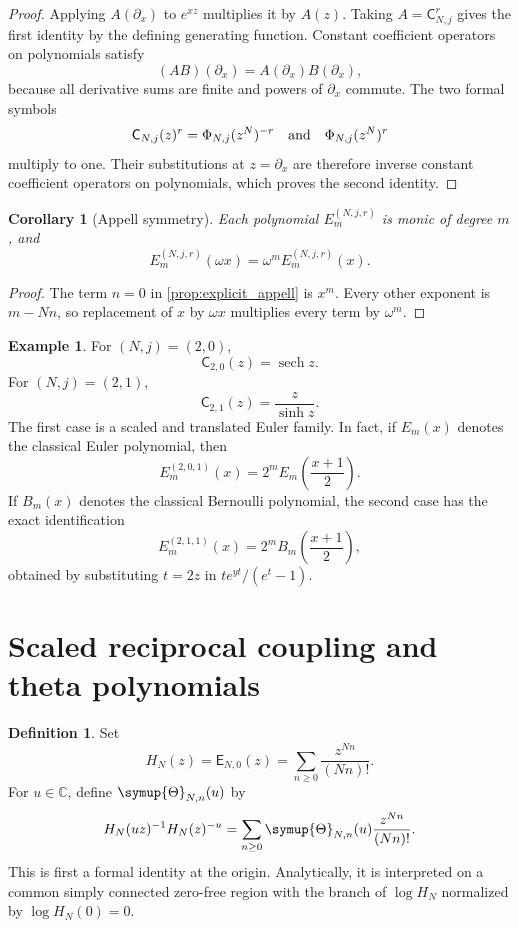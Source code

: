 \documentclass[11pt,letterpaper]{article}
\newtheorem{corollary}[corollary]{Corollary}
\theoremstyle{definition}
\newtheorem{definition}[definition]{Definition}
\newtheorem{example}[example]{Example}
\theoremstyle{remark}
\newcommand{\CC}{\mathbb C}
\newcommand{\Efun}{\mathsf E}
\newcommand{\Cfun}{\mathsf C}
\newcommand{\Thetafun}{\symup{\Theta}}
\newcommand{\sech}{\operatorname{sech}}
\begin{document}
\begin{proof}
Applying $A(\partial_x)$ to $e^{xz}$ multiplies it by $A(z)$.  Taking
$A=\Cfun_{N,j}^r$ gives the first identity by the defining generating
function.  Constant coefficient operators on polynomials satisfy
\[
(AB)(\partial_x)=A(\partial_x)B(\partial_x),
\]
because all derivative sums are finite and powers of $\partial_x$
commute.  The two formal symbols
\[
\Cfun_{N,j}(z)^r=\Phi_{N,j}(z^N)^{-r}
\quad\hbox{and}\quad
\Phi_{N,j}(z^N)^r
\]
multiply to one.  Their substitutions at $z=\partial_x$ are therefore
inverse constant coefficient operators on polynomials, which proves
the second identity.
\end{proof}


\begin{corollary}[Appell symmetry]\label{cor:appell_symmetry}
Each polynomial $E_m^{(N,j,r)}$ is monic of degree $m$, and
\[
E_m^{(N,j,r)}(\omega x)
=
\omega^mE_m^{(N,j,r)}(x).
\]
\end{corollary}

\begin{proof}
The term $n=0$ in \cref{prop:explicit_appell} is $x^m$.  Every other exponent is $m-Nn$, so replacement of $x$ by $\omega x$ multiplies every term by $\omega^m$.
\end{proof}

\begin{example}\label{ex:euler_boundaries}
For $(N,j)=(2,0)$,
\[
\Cfun_{2,0}(z)=\sech z.
\]
For $(N,j)=(2,1)$,
\[
\Cfun_{2,1}(z)=\frac z{\sinh z}.
\]
The first case is a scaled and translated Euler family.  In fact, if $E_m(x)$ denotes the classical Euler polynomial, then
\[
E_m^{(2,0,1)}(x)
=
2^mE_m\left(\frac{x+1}{2}\right).
\]
If $B_m(x)$ denotes the classical Bernoulli polynomial, the second case has
the exact identification
\[
E_m^{(2,1,1)}(x)
=
2^mB_m\left(\frac{x+1}{2}\right),
\]
obtained by substituting $t=2z$ in
$t e^{yt}/(e^t-1)$.
\end{example}

\section{Scaled reciprocal coupling and theta polynomials}\label{sec:theta}

\begin{definition}\label{def:unsigned_denominator}
Set
\[
H_N(z)=\Efun_{N,0}(z)
=
\sum_{n\geq0}\frac{z^{Nn}}{(Nn)!}.
\]
For $u\in\CC$, define $\Thetafun_{N,n}(u)$ by
\[
H_N(uz)^{-1}H_N(z)^{-u}
=
\sum_{n\geq0}\Thetafun_{N,n}(u)\frac{z^{Nn}}{(Nn)!}.
\]
This is first a formal identity at the origin.  Analytically, it is interpreted
on a common simply connected zero-free region with the branch of
$\log H_N$ normalized by $\log H_N(0)=0$.
\end{definition}
\end{document}
